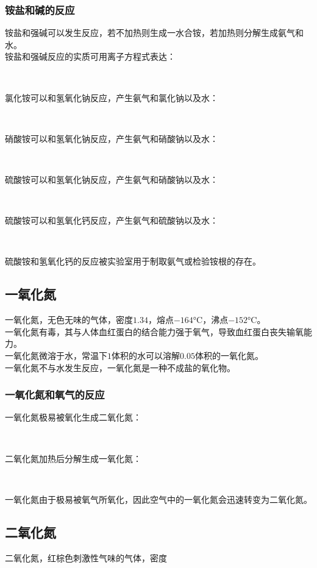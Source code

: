 \documentclass[UTF8]{ctexart}
\begin{document}
\subsubsection{铵盐和碱的反应}
    铵盐和强碱可以发生反应，若不加热则生成一水合铵，若加热则分解生成氨气和水。\\[3mm]
    铵盐和强碱反应的实质可用离子方程式表达：
    \begin{center}
        \\[6mm]
    \end{center}
    氯化铵可以和氢氧化钠反应，产生氨气和氯化钠以及水：
    \begin{center}
        \\[6mm]
    \end{center}
    硝酸铵可以和氢氧化钠反应，产生氨气和硝酸钠以及水：
    \begin{center}
        \\[6mm]
    \end{center}
    硫酸铵可以和氢氧化钠反应，产生氨气和硝酸钠以及水：
    \begin{center}
        \\[6mm]
    \end{center}
    硫酸铵可以和氢氧化钙反应，产生氨气和硫酸钠以及水：
    \begin{center}
        \\[6mm]
    \end{center}
    硫酸铵和氢氧化钙的反应被实验室用于制取氨气或检验铵根的存在。\\[3mm]

\newpage
    
\subsection{一氧化氮}
    一氧化氮，无色无味的气体，密度$1.34$，熔点$-164$\si{\degreeCelsius}，沸点$-152$\si{\degreeCelsius}。\\[3mm]
    一氧化氮有毒，其与人体血红蛋白的结合能力强于氧气，导致血红蛋白丧失输氧能力。\\[3mm]
    一氧化氮微溶于水，常温下$1$体积的水可以溶解$0.05$体积的一氧化氮。\\[3mm]
    一氧化氮不与水发生反应，一氧化氮是一种不成盐的氧化物。

\subsubsection{一氧化氮和氧气的反应}
    一氧化氮极易被氧化生成二氧化氮：
    \begin{center}
        \\[6mm]
    \end{center}
    二氧化氮加热后分解生成一氧化氮：
    \begin{center}
        \\[6mm]
    \end{center}
    一氧化氮由于极易被氧气所氧化，因此空气中的一氧化氮会迅速转变为二氧化氮。

\subsection{二氧化氮}
    二氧化氮，红棕色刺激性气味的气体，密度
\end{document}
